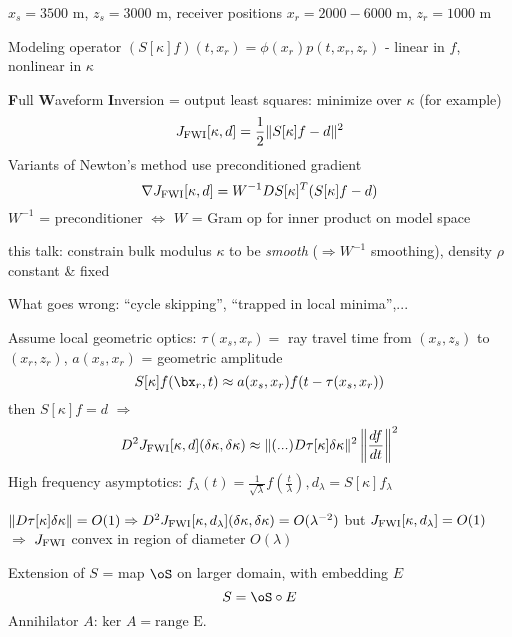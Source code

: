 $x_s=3500$ m, $z_s=3000$ m, receiver positions $x_r=2000-6000$ m, $z_r=1000$ m



Modeling operator $(S[\kappa]f)(t,x_r) = \phi(x_r) p(t,x_r,z_r)$ - linear in $f$, nonlinear in $\kappa$


{\bf F}ull {\bf W}aveform {\bf I}nversion = output least squares: minimize over $\kappa$ (for example)
\[
J_{\rm FWI}[\kappa,d] = \frac{1}{2}\|S[\kappa]f-d\|^2
\]
Variants of Newton's method use preconditioned gradient
\[
\nabla J_{\rm FWI}[\kappa,d] = W^{-1}DS[\kappa]^T(S[\kappa]f-d)
\]
$W^{-1}$ = preconditioner $\Leftrightarrow$ $W$ = Gram op for inner product on model space

{\color{blue} this talk: constrain bulk modulus $\kappa$ to be {\em smooth} ($\Rightarrow W^{-1}$ smoothing), density $\rho$ constant \& fixed}

What goes wrong: ``cycle skipping'', ``trapped in local minima'',...

Assume local geometric optics: $\tau(x_s,x_r) =$ ray travel time from $(x_s,z_s)$ to $(x_r,z_r)$, $a(x_s,x_r)$ = geometric amplitude
\[
S[\kappa]f(\bx_r,t) \approx a(x_s,x_r)f(t-\tau(x_s,x_r))
\]
then $S[\kappa]f=d$ $\Rightarrow$
\[
D^2J_{\rm FWI}[\kappa,d](\delta \kappa,\delta \kappa) \approx \|(...)D\tau[\kappa]\delta \kappa\|^2\left\|\frac{df}{dt}\right\|^2
\]
High frequency asymptotics: $f_{\lambda}(t) = \frac{1}{\sqrt{\lambda}} f\left(\frac{t}{\lambda}\right), d_{\lambda} = S[\kappa]f_{\lambda}$ 

$
\|D\tau[\kappa]\delta \kappa\|=O(1) \Rightarrow D^2J_{\rm FWI}[\kappa,d_{\lambda}](\delta \kappa,\delta \kappa)=O(\lambda^{-2})$ but $ J_{\rm FWI}[\kappa,d_{\lambda}]=O(1)
$
$\Rightarrow$ {\color{blue} $J_{\rm FWI}$ convex in region of diameter $O(\lambda)$}

Extension of $S$ = map $\oS$ on larger domain, with embedding $E$ 
\[
S = \oS \circ E
\]
Annihilator $A$: $\mbox{ker }A = \mbox{range E}$. 

